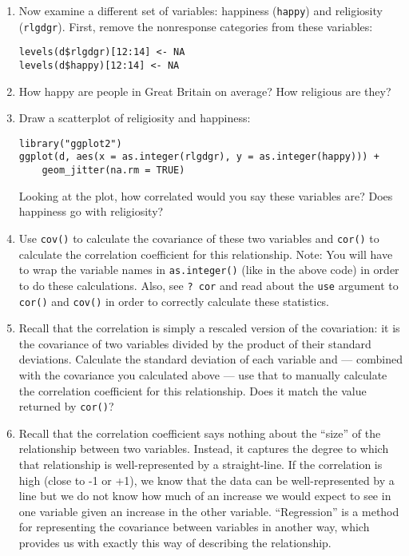 \documentclass[a4paper,12pt]{article}
\begin{document}
\begin{enumerate}
\item Now examine a different set of variables: happiness (\texttt{happy}) and religiosity (\texttt{rlgdgr}). First, remove the nonresponse categories from these variables:

\begin{verbatim}
levels(d$rlgdgr)[12:14] <- NA
levels(d$happy)[12:14] <- NA
\end{verbatim}

\item How happy are people in Great Britain on average? How religious are they?

\item Draw a scatterplot of religiosity and happiness:

\begin{verbatim}
library("ggplot2")
ggplot(d, aes(x = as.integer(rlgdgr), y = as.integer(happy))) +
    geom_jitter(na.rm = TRUE)
\end{verbatim}

\noindent Looking at the plot, how correlated would you say these variables are? Does happiness go with religiosity?

\item Use \texttt{cov()} to calculate the covariance of these two variables and \texttt{cor()} to calculate the correlation coefficient for this relationship. Note: You will have to wrap the variable names in \texttt{as.integer()} (like in the above code) in order to do these calculations. Also, see \texttt{? cor} and read about the \texttt{use} argument to \texttt{cor()} and \texttt{cov()} in order to correctly calculate these statistics.

\item Recall that the correlation is simply a rescaled version of the covariation: it is the covariance of two variables divided by the product of their standard deviations. Calculate the standard deviation of each variable and --- combined with the covariance you calculated above --- use that to manually calculate the correlation coefficient for this relationship. Does it match the value returned by \texttt{cor()}?

\item Recall that the correlation coefficient says nothing about the ``size'' of the relationship between two variables. Instead, it captures the degree to which that relationship is well-represented by a straight-line. If the correlation is high (close to -1 or +1), we know that the data can be well-represented by a line but we do not know how much of an increase we would expect to see in one variable given an increase in the other variable. ``Regression'' is a method for representing the covariance between variables in another way, which provides us with exactly this way of describing the relationship.


\end{enumerate}
\end{document}
